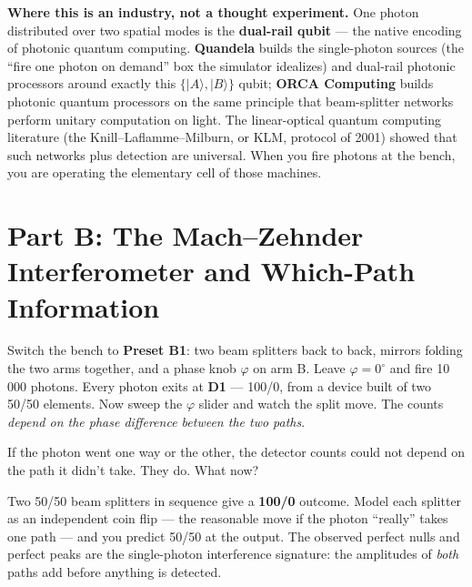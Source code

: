 \documentclass[a4paper,11pt]{article}
\providecommand{\ket}[1]{|#1\rangle}
\begin{document}
\begin{industrybox}
\textbf{Where this is an industry, not a thought experiment.} One photon distributed
over two spatial modes is the \textbf{dual-rail qubit} --- the native encoding of
photonic quantum computing. \textbf{Quandela} builds the single-photon sources (the
``fire one photon on demand'' box the simulator idealizes) and dual-rail photonic
processors around exactly this $\{\ket{A}, \ket{B}\}$ qubit; \textbf{ORCA Computing}
builds photonic quantum processors on the same principle that beam-splitter networks
perform unitary computation on light. The linear-optical quantum computing
literature (the Knill--Laflamme--Milburn, or KLM, protocol of 2001) showed that such networks plus detection are universal.
When you fire photons at the bench, you are operating the elementary cell of those
machines.
\end{industrybox}

\section{Part B: The Mach--Zehnder Interferometer and Which-Path Information}

\begin{benchbox}
Switch the bench to \textbf{Preset B1}: two beam splitters back to back, mirrors
folding the two arms together, and a phase knob $\varphi$ on arm B. Leave
$\varphi = 0^\circ$ and fire 10\,000 photons. Every photon exits at \textbf{D1} ---
100/0, from a device built of two 50/50 elements. Now sweep the $\varphi$ slider and
watch the split move. The counts \emph{depend on the phase difference between the two
paths}.
\end{benchbox}

\begin{questionbox}
If the photon went one way or the other, the detector counts could not depend on the
path it didn't take. They do. What now?
\end{questionbox}

\begin{shockbox}
Two 50/50 beam splitters in sequence give a \textbf{100/0} outcome. Model each
splitter as an independent coin flip --- the reasonable move if the photon ``really''
takes one path --- and you predict 50/50 at the output. The observed perfect nulls
and perfect peaks are the single-photon interference signature: the amplitudes of
\emph{both} paths add before anything is detected.
\end{shockbox}
\end{document}
